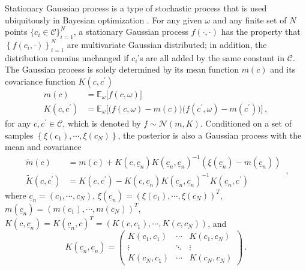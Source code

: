 Stationary Gaussian process is a type of stochastic process that is used ubiquitously in Bayesian optimization
\cite{GP book}.
For any given $\omega$ and any finite set of $N$ points $\{c_i\in \mathcal{C}\}_{i=1}^N$, 
a stationary Gaussian process $f(\cdot, \cdot)$ 
has the property that $\left\{ f(c_i, \cdot) \right\}_{i=1}^N$ 
are multivariate Gaussian distributed; in addition, the distribution remains unchanged if 
$c_i$'s are all added by the same constant in $\mathcal{C}$.
The Gaussian process is solely determined by its mean 
function $m(c)$ and its covariance function $K(c,c^\prime)$ \cite{GP book}
\begin{equation}\begin{split}
    m(c) &= \mathbb{E}_\omega\big[f(c, \omega)\big]\\
    K(c, c^\prime) &= \mathbb{E}_\omega\Big[\big(f(c,\omega)-m(c)\big)\big(f(c^\prime,\omega)
                    -m(c^\prime)\big)\Big]\,,
\end{split}\end{equation}
for any $c, c^\prime \in \mathcal{C}$, which is denoted by $f \sim\mathcal{N}(m, K)$.
Conditioned on a set of samples $\left\{\xi(c_1), \cdots, \xi(c_N)\right\}$, 
the posterior is also a Gaussian process with the mean and covariance \cite{GP book}
\begin{equation}\begin{split}
    \tilde{m}(c) & 
    = m(c) + K(c,\underline{c}_n)K(\underline{c}_n,\underline{c}_n)^{-1}
    \left(\xi(\underline{c}_n) - m(\underline{c}_n)\right)\\
    \tilde{K}(c, c^\prime)&=
    K(c,c^\prime) - K(c,\underline{c}_n) K(\underline{c}_n, \underline{c}_n)^{-1} K(\underline{c}_n,c^\prime)
\end{split}\,,
\label{eqn: posterior formulation}
\end{equation}
where $\underline{c}_n = \left( c_1, \cdots, c_N\right)$,
$\xi(\underline{c}_n) = \left( \xi(c_1), \cdots, \xi(c_N)\right)^T$, 
$m(\underline{c}_n) = \left( m(c_1), \cdots, m(c_N)\right)^T$,
$K(c, \underline{c}_n) = K(\underline{c}_n, c)^T = \left(
K(c, c_1), \cdots, K(c, c_N)\right)$, and
\begin{equation*}
    K(\underline{c}_n, \underline{c}_n) = \begin{pmatrix} 
        K(c_1, c_1) & \cdots & K(c_1, c_N)\\
        \vdots      & \ddots & \vdots\\
        K(c_N, c_1) & \cdots & K(c_N, c_N)
    \end{pmatrix}\,.
\end{equation*}
